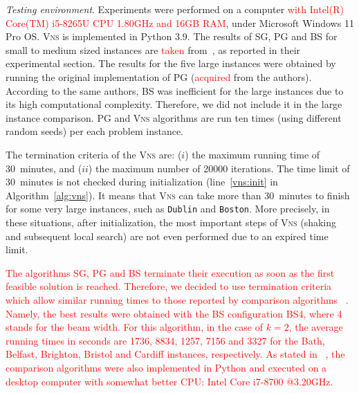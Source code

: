 \documentclass[dvipsnames,format=sigconf]{acmart} %
\begin{document}
 \emph{Testing environment}. Experiments were performed on a computer \textcolor{red}{with Intel(R) Core(TM) i5-8265U CPU 1.80GHz and 16GB RAM}, under Microsoft Windows 11 Pro OS. \textsc{Vns} is implemented in Python 3.9. The results of SG, PG and BS for small to medium sized instances are \textcolor{red}{taken} from~\cite{corcoran2021heuristics}, as reported in their experimental section. The results for the five large instances were obtained by running the original implementation of PG (\textcolor{red}{acquired} from the authors). According to the same authors, BS was inefficient for the large instances due to its high computational complexity. Therefore, we did not include it in the large instance comparison.  
 PG and \textsc{Vns} algorithms are run ten times (using different random seeds) per each problem instance. 
   
  The termination criteria of the \textsc{Vns} are: ($i$) the maximum running time of 30~minutes, and ($ii$) the maximum number of 20000 iterations. The time limit of 30~minutes is not checked during initialization (line~\ref{vns:init} in Algorithm~\ref{alg:vns}). It means that \textsc{Vns} can take more than 30~minutes to finish for some very large instances, such as \texttt{Dublin} and \texttt{Boston}. More precisely, in these situations, after initialization, the most important steps of \textsc{Vns} (shaking and subsequent local search) are not even performed due to an expired time limit.
  
  \textcolor{red}{The algorithms SG, PG and BS terminate their execution as soon as the first feasible solution is reached. Therefore, we decided to use termination criteria which allow similar running times to those reported by comparison algorithms ~\cite{corcoran2021heuristics}. Namely, the best results were obtained with the BS configuration BS4, where 4 stands for the beam width. For this algorithm, in the case of $k=2$, the average running times in seconds are 1736, 8834, 1257, 7156 and 3327 for the Bath, Belfast, Brighton, Bristol and Cardiff instances, respectively.} \textcolor{red}{As stated in ~\cite{corcoran2021heuristics}, the comparison algorithms were also implemented in  Python and executed on a desktop computer with somewhat better CPU: Intel Core i7-8700 @3.20GHz. }
   
\end{document}
